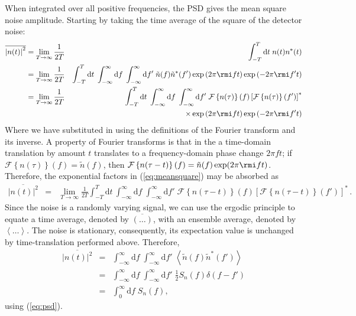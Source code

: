 When integrated over all positive frequencies, the PSD gives the mean square noise amplitude. Starting by taking the time average of the square of the detector noise:
\begin{eqnarray}\label{eq:meansquare}
\overline{\left|n(t)\right|^{2}} &= \lim_{T\rightarrow\infty}\frac{1}{2T} & \int_{-T}^{T}\mathrm{d}t\; n(t)n^{*}(t) \\
 &= \lim_{T\rightarrow\infty}\frac{1}{2T} & \int_{-T}^{T}\mathrm{d}t\; \int_{-\infty}^{\infty}\mathrm{d}f\;\int_{-\infty}^{\infty}\mathrm{d}f'\;\tilde{n}(f)\tilde{n}^{*}(f')\exp\left(2\pi \rmi ft\right)\exp\left(-2\pi \rmi f't\right) \nonumber\\
 &= \lim_{T\rightarrow\infty}\frac{1}{2T} & \int_{-T}^{T}\mathrm{d}t\; \int_{-\infty}^{\infty}\mathrm{d}f\;\int_{-\infty}^{\infty}\mathrm{d}f'\;{\mathcal{F}}\left\{ n(\tau) \right\}(f)\left[{\mathcal{F}}\left\{ n(\tau) \right\}(f')\right]^{*} \nonumber \\*
 & & \times \exp\left(2\pi \rmi ft\right)\exp\left(-2\pi \rmi f't\right)
\end{eqnarray}
Where we have substituted in using the definitions of the Fourier transform and its inverse. A property of Fourier transforms is that in the a time-domain translation by amount $t$ translates to a frequency-domain phase change $2\pi ft$; if ${\mathcal{F}}\left\{ n(\tau) \right\}(f) = \tilde{n}(f)$, then ${\mathcal{F}}\left\{ n(\tau-t) \right\}(f) = \tilde{n}(f)\exp (2\pi \rmi ft )$. Therefore, the exponential factors in (\ref{eq:meansquare}) may be absorbed as
\begin{eqnarray}
\overline{\left|n(t)\right|^{2}} &=& \lim_{T\rightarrow\infty}\frac{1}{2T}\int_{-T}^{T} \mathrm{d}t\:\int_{-\infty}^{\infty}\mathrm{d}f\;\int_{-\infty}^{\infty}\mathrm{d}f'\;{\mathcal{F}}\left\{ n(\tau-t) \right\}(f)\left[{\mathcal{F}}\left\{ n(\tau-t) \right\}(f')\right]^{*} \, .
\end{eqnarray}
Since the noise is a randomly varying signal, we can use the ergodic principle to equate a time average, denoted by $\overline{(\ldots)}$, with an ensemble average, denoted by $\left<\ldots\right>$. The noise is stationary, consequently, its expectation value is unchanged by time-translation performed above. Therefore,
\begin{eqnarray}\label{eq:meansquare1}
\overline{\left|n(t)\right|^{2}} &=& \int_{-\infty}^{\infty}\mathrm{d}f\;\int_{-\infty}^{\infty}\mathrm{d}f'\;\left<\tilde{n}(f)\tilde{n}^{*}(f')\right> \\
&=& \int_{-\infty}^{\infty}\mathrm{d}f\;\int_{-\infty}^{\infty}\mathrm{d}f'\;\frac{1}{2}S_{n}(f)\delta(f-f') \nonumber \\
&=& \int_{0}^{\infty}\mathrm{d}f\; S_{n}(f),
\end{eqnarray}
using (\ref{eq:psd}).

